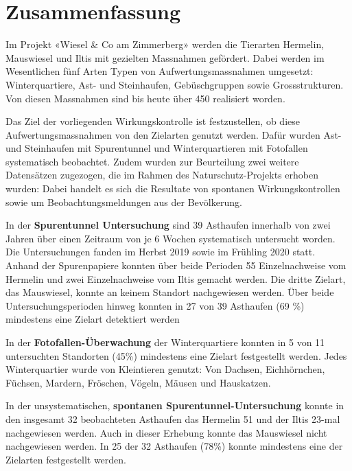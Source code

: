 \documentclass[
]{scrbook}
\let\oldmaketitle\maketitle
\begin{document}
\let\maketitle\oldmaketitle



{
\setcounter{tocdepth}{1}
\tableofcontents
}
\hypertarget{zusammenfassung}{%
\chapter{Zusammenfassung}\label{zusammenfassung}}

Im Projekt «Wiesel \& Co am Zimmerberg» werden die Tierarten Hermelin, Mauswiesel und Iltis mit gezielten Massnahmen gefördert. Dabei werden im Wesentlichen fünf Arten Typen von Aufwertungsmassnahmen umgesetzt: Winterquartiere, Ast- und Steinhaufen, Gebüschgruppen sowie Grossstrukturen. Von diesen Massnahmen sind bis heute über 450 realisiert worden.

Das Ziel der vorliegenden Wirkungskontrolle ist festzustellen, ob diese Aufwertungsmassnahmen von den Zielarten genutzt werden. Dafür wurden Ast- und Steinhaufen mit Spurentunnel und Winterquartieren mit Fotofallen systematisch beobachtet. Zudem wurden zur Beurteilung zwei weitere Datensätzen zugezogen, die im Rahmen des Naturschutz-Projekts erhoben wurden: Dabei handelt es sich die Resultate von spontanen Wirkungskontrollen sowie um Beobachtungsmeldungen aus der Bevölkerung.

In der \textbf{Spurentunnel Untersuchung} sind 39 Asthaufen innerhalb von zwei Jahren über einen Zeitraum von je 6 Wochen systematisch untersucht worden. Die Untersuchungen fanden im Herbst 2019 sowie im Frühling 2020 statt. Anhand der Spurenpapiere konnten über beide Perioden 55 Einzelnachweise vom Hermelin und zwei Einzelnachweise vom Iltis gemacht werden. Die dritte Zielart, das Mauswiesel, konnte an keinem Standort nachgewiesen werden. Über beide Untersuchungsperioden hinweg konnten in 27 von 39 Asthaufen (69 \%) mindestens eine Zielart detektiert werden

In der \textbf{Fotofallen-Überwachung} der Winterquartiere konnten in 5 von 11 untersuchten Standorten (45\%) mindestens eine Zielart festgestellt werden. Jedes Winterquartier wurde von Kleintieren genutzt: Von Dachsen, Eichhörnchen, Füchsen, Mardern, Fröschen, Vögeln, Mäusen und Hauskatzen.

In der unsystematischen, \textbf{spontanen Spurentunnel-Untersuchung} konnte in den insgesamt 32 beobachteten Asthaufen das Hermelin 51 und der Iltis 23-mal nachgewiesen werden. Auch in dieser Erhebung konnte das Mauswiesel nicht nachgewiesen werden. In 25 der 32 Asthaufen (78\%) konnte mindestens eine der Zielarten festgestellt werden.
\end{document}
